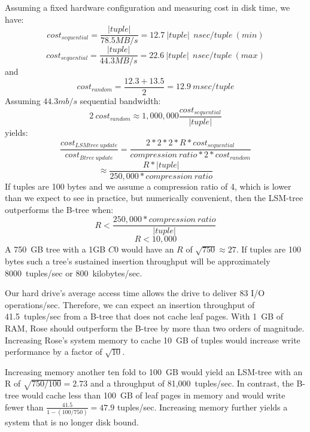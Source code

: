 \documentclass{vldb}
\newcommand{\rows}{Rose\xspace}
\newcommand{\rowss}{Rose's\xspace}
\begin{document}
Assuming a fixed hardware configuration and measuring cost in disk
time, we have:
\[
   cost_{sequential}=\frac{|tuple|}{78.5MB/s}=12.7~|tuple|~~nsec/tuple~(min)
\]
\[
   cost_{sequential}=\frac{|tuple|}{44.3MB/s}=22.6~|tuple|~~nsec/tuple~(max)
\]
and
\[
   cost_{random}=\frac{12.3+13.5}{2} = 12.9~msec/tuple
\]
Assuming $44.3mb/s$ sequential bandwidth:
\[
2~cost_{random}\approx1,000,000\frac{cost_{sequential}}{|tuple|}
\] yields: \[
    \frac{cost_{LSMtree~update}}{cost_{Btree~update}}=\frac{2*2*2*R*cost_{sequential}}{compression~ratio*2*cost_{random}}
\]
\[
   \approx\frac{R*|tuple|}{250,000*compression~ratio}
\]
If tuples are 100 bytes and we assume a compression ratio of 4, which is lower
than we expect to see in practice, but numerically convenient, then the
LSM-tree outperforms the B-tree when:
\[
    R < \frac{250,000*compression~ratio}{|tuple|}
\]
\[
    R < 10,000
\]
A 750~GB tree with a 1GB $C0$ would have an $R$ of $\sqrt{750}\approx27$.  
If tuples are 100 bytes such a tree's sustained insertion throughput will be
approximately 8000~tuples/sec or 800~kilobytes/sec.

Our hard drive's average access time allows the drive to deliver 83 I/O operations/sec.
Therefore, we can expect an insertion throughput of 41.5~tuples/sec from a B-tree
that does not cache leaf pages.  With 1~GB of RAM, \rows should outperform the
B-tree by more than two orders of magnitude.  Increasing \rowss system
memory to cache 10~GB of tuples would increase write performance by a
factor of $\sqrt{10}$.


Increasing memory another ten fold to 100~GB would yield an LSM-tree
with an R of $\sqrt{750/100} = 2.73$ and a throughput of 81,000~tuples/sec.
In contrast, the B-tree would cache less than 100~GB of leaf pages
in memory and would write fewer than $\frac{41.5}{1-(100/750)} = 47.9$
tuples/sec.  Increasing memory further yields a system that
is no longer disk bound.
\end{document}
